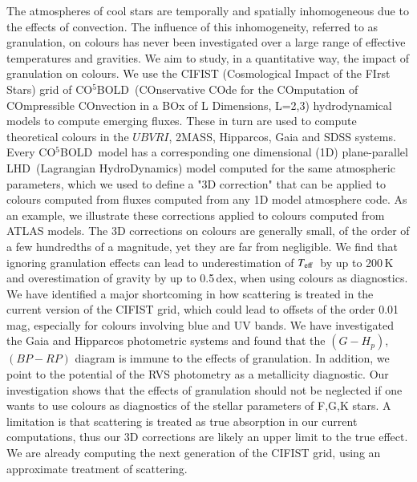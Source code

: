 \documentclass[]{aa}
\def\teff{$T\rm_{eff}$}
\newcommand{\cobold}{{\sf CO$^5$BOLD}}
\renewcommand{\lhd}{{\sf LHD}}
\begin{document}
\abstract%
{The atmospheres of cool stars 
are temporally and spatially inhomogeneous
due to the effects of convection.  
The influence of this inhomogeneity, referred
to as granulation, on colours  has never 
been investigated over a large range of effective temperatures and gravities.
}
{We aim to study, in a quantitative way, the impact
of granulation on colours.
}
{
We use the CIFIST (Cosmological Impact of the FIrst Stars) grid of 
\cobold\ (COnservative COde for the COmputation of COmpressible COnvection in a BOx of L Dimensions, L=2,3)
hydrodynamical models to compute emerging fluxes. 
These in turn are used to compute theoretical colours in the $UBVRI$, 2MASS, Hipparcos, Gaia 
and SDSS systems. 
Every \cobold\ model has a corresponding one dimensional (1D) plane-parallel 
\lhd\ (Lagrangian HydroDynamics) model computed for the same atmospheric parameters, 
which we used to  define a "3D correction" that can
be applied to colours computed from fluxes
computed from any 1D model
atmosphere code. As an example, we illustrate
these corrections applied to colours computed from ATLAS models.
}
{
The 3D corrections on colours are generally small, of the order of a few hundredths of a magnitude, yet they are far from negligible. We find that ignoring granulation effects can lead to underestimation of \teff\ by up to 200\,K and overestimation of gravity by up to 0.5\,dex, when using colours
as diagnostics. 
We have identified a major shortcoming in how scattering is 
treated in the current version of the CIFIST grid, which could lead to offsets of the order 0.01\,mag, especially for colours involving blue and UV bands. 
We have investigated the Gaia and Hipparcos photometric systems
and found that the  $(G-H_p)$,$(BP-RP)$ diagram
is  immune to the effects of granulation. In addition, we point to  
the potential of the RVS photometry as a metallicity diagnostic.
}
{Our investigation shows that the effects
of granulation should not be neglected if one
wants to use colours as diagnostics of the stellar
parameters of F,G,K stars. A limitation is that scattering is treated as true absorption
in our current computations, thus our 3D corrections are likely
an upper limit to the true effect.
We are already computing the next generation
of the CIFIST grid, using an approximate treatment
of scattering. }
\maketitle
\end{document}
